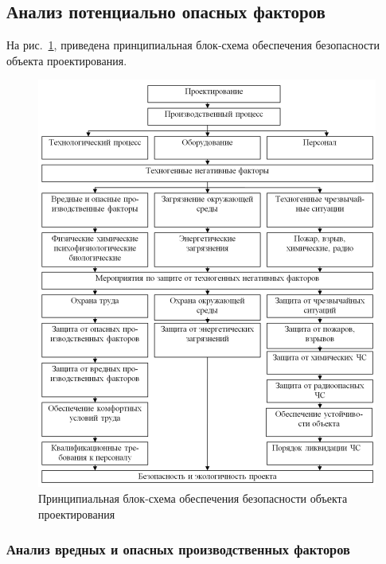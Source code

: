 \subsection{Анализ потенциально опасных факторов}

На рис.~\ref{img:ecology-schema}, приведена принципиальная блок-схема обеспечения безопасности объекта проектирования.

\begin{figure}[h!]
	\begin{center}
		\begin{minipage}[h]{\linewidth}
			\includegraphics[width=\linewidth]{images/ecology-schema.png}
			\caption{Принципиальная блок-схема обеспечения безопасности объекта проектирования}
			\label{img:ecology-schema}
		\end{minipage}
		\hfill
	\end{center}
\end{figure}  

\subsubsection{Анализ вредных и опасных производственных факторов}

